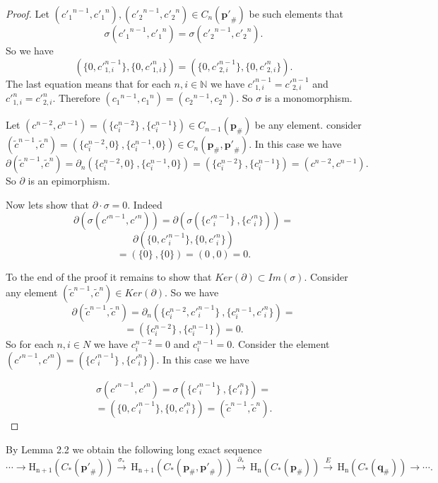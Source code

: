 \documentclass[10pt]{article}
\theoremstyle{definition}
\begin{document}
\begin{proof}
Let $( {{{c'}_1}^{n-1}},{{{c'}_1}^{n}} ), ( {{{c'}_2}^{n-1}},{{{c'}_2}^{n}} )\in {{C}_{n}}( \mathbf{p'}_{\#})$ be such elements that
$${{\sigma }}( {{c'_1}^{n-1}},{{c'_1}^{n}} )=
{{\sigma }}( {{c'_2}^{n-1}},{{c'_2}^{n}} ).$$
So we have
$$( \{ 0, {c'}_{1,i}^{n-1} \},\{ 0,{c'}_{1,i}^{n}\})=( \{ 0, {c'}_{2,i}^{n-1} \},\{ 0,{c'}_{2,i}^{n}\}).$$
The last equation means that for each $n,i \in \mathbb{N}$ we have ${c'}_{1,i}^{n-1}={c'}_{2,i}^{n-1}$ and ${c'}_{1,i}^{n}={c'}_{2,i}^{n}$. Therefore 
$( {{c_1}^{n-1}},{{c_1}^{n}} )=( {{c_2}^{n-1}},{{c_2}^{n}}).$ So $\sigma$ is a monomorphism.

Let $( {{{c}}^{n-2}},{{{c}}^{n-1}} )=( \{{c}_{i}^{n-2}\}~,\{{c}_{i}^{n-1}\} ) \in {{C}_{n-1}}( \mathbf{p}_{\#})$ be any element. consider $( {{{\tilde{c}}}^{n-1}},{{{\tilde{c}}}^{n}} )=( \{ c_{i}^{n-2},0 \}~,\{c_{i}^{n-1},0 \} ) \in {{C}_{n}}( {{\mathbf{p}}_{\#}},\mathbf{p'}_{\#}).$ In this case we have 
   	$${{\partial }}( {{{\tilde{c}}}^{n-1}},{{{\tilde{c}}}^{n}} )={{\partial }_{n}}( \{c_{i}^{n-2},0\}~,\{c_{i}^{n-1},0 \} )=( \{c_{i}^{n-2} \}~, \{ c_{i}^{n-1} \} )=( {{{c}}^{n-2}},{{{c}}^{n-1}} ).$$
So $\partial$ is an epimorphism.

Now lets show that $\partial \cdot \sigma = 0$. Indeed
$$\partial\left( {{\sigma }} \left( {{c'}^{n-1}},{{c'}^{n}} \right) \right)=\partial \left({{\sigma }} \left( \{{c'}_{i}^{n-1}\}~,\{ {c'}_{i}^{n} \} \right) \right)=$$
$$\partial \left( \{ 0, {c'}_{i}^{n-1} \},\{ 0,{c'}_{i}^{n}\} \right)$$   
$$= \left( \{ 0 \}~, \{ 0 \} \right)=\left(  0 ~,  0  \right)=0.$$

To the end of the proof it remains to show that $Ker(\partial) \subset Im(\sigma)$. Consider any element $( {{{\tilde{c}}}^{n-1}},{{{\tilde{c}}}^{n}} )\in Ker(\partial)$. So we have 
$${{\partial }}( {{{\tilde{c}}}^{n-1}},{{{\tilde{c}}}^{n}} )={{\partial }_{n}}( \{c_{i}^{n-2},{c'}_{i}^{n-1}\}~,\{c_{i}^{n-1},{c'}_{i}^{n}\} )=$$
		$$=( \{c_{i}^{n-2} \}~, \{ c_{i}^{n-1} \} )=0.$$
So for each $n,i \in N$ we have $c_{i}^{n-2}=0$ and $c_{i}^{n-1}=0$. Consider the element $({c'}^{n-1},{c'}^n)=( \{{c'}_{i}^{n-1}\}~,\{{c'}_{i}^{n}\} )$. In this case we have 

$${{\sigma }}( {{c'}^{n-1}},{{c'}^{n}} )={{\sigma }}( \{{c'}_{i}^{n-1}\}~,\{ {c'}_{i}^{n} \} )=$$
$$=( \{ 0, {c'}_{i}^{n-1} \},\{ 0,{c'}_{i}^{n}\})=( {{{\tilde{c}}}^{n-1}},{{{\tilde{c}}}^{n}} ).$$
\end{proof}
 By Lemma 2.2 we obtain the following long exact sequence  
$$\cdots \to {{\text{H}}_{\text{n}+1}}( {{C}_{*}}( \mathbf{p'}_{\#} ) )\overset{{{\sigma }_{*}}}{\mathop{\to }}\,{{\text{H}}_{\text{n}+1}}( {{C}_{*}}( {{\mathbf{p}}_{\#}},\mathbf{p'}_{\#} ) )\overset{{{\partial }_{*}}}{\mathop{\to }}\,{{\text{H}}_{\text{n}}}( {{C}_{*}}( {{\mathbf{p}}_{\#}} ) )\overset{E}{\mathop{\to }}\,{{\text{H}}_{\text{n}}}( {{C}_{*}}( {{\mathbf{q}}_{\#}} ) )\to \cdots .~~~~$$ 
\end{document}
